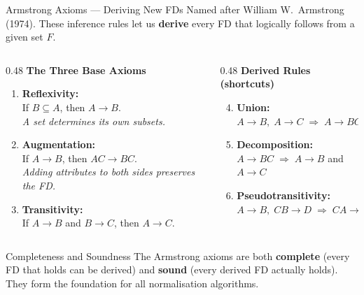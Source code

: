 \begin{frame}{Armstrong Axioms --- Deriving New FDs}
  Named after William W.\ Armstrong (1974).  These inference rules let us
  \textbf{derive} every FD that logically follows from a given set $F$.

  \begin{columns}[t]
    \begin{column}{0.48\textwidth}
      \textbf{The Three Base Axioms}
      \begin{enumerate}
        \item \textbf{Reflexivity:}\\
              If $B \subseteq A$, then $A \to B$.\\
              \textit{A set determines its own subsets.}
        \item \textbf{Augmentation:}\\
              If $A \to B$, then $AC \to BC$.\\
              \textit{Adding attributes to both sides preserves the FD.}
        \item \textbf{Transitivity:}\\
              If $A \to B$ and $B \to C$, then $A \to C$.
      \end{enumerate}
    \end{column}
    \begin{column}{0.48\textwidth}
      \textbf{Derived Rules (shortcuts)}
      \begin{enumerate}
        \setcounter{enumi}{3}
        \item \textbf{Union:}\\
              $A \to B,\; A \to C \;\Rightarrow\; A \to BC$
        \item \textbf{Decomposition:}\\
              $A \to BC \;\Rightarrow\; A \to B$ and $A \to C$
        \item \textbf{Pseudotransitivity:}\\
              $A \to B,\; CB \to D \;\Rightarrow\; CA \to D$
      \end{enumerate}
    \end{column}
  \end{columns}

  \vspace{0.5em}
  \begin{alertblock}{Completeness and Soundness}
    The Armstrong axioms are both \textbf{complete} (every FD that holds can be
    derived) and \textbf{sound} (every derived FD actually holds). They form
    the foundation for all normalisation algorithms.
  \end{alertblock}
\end{frame}


